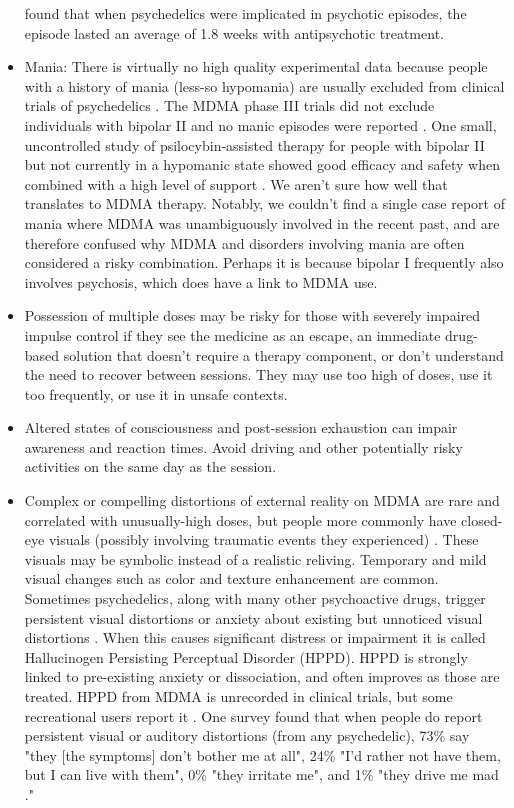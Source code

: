 \documentclass[12pt,letterpaper]{book}
\begin{document}
\begin{itemize}
    \textcite{psychosisTreatment} found that when psychedelics were implicated in psychotic episodes, the episode lasted an average of 1.8 weeks with antipsychotic treatment.
    \item Mania: There is virtually no high quality experimental data because people with a history of mania (less-so hypomania) are usually excluded from clinical trials of psychedelics \cite{gardBipolar}. The MDMA phase III trials did not exclude individuals with bipolar II and no manic episodes were reported \cite{mitchellMDMAClinicalTrial2}. One small, uncontrolled study of psilocybin-assisted therapy for people with bipolar II but not currently in a hypomanic state showed good efficacy and safety when combined with a high level of support \cite{aaronsonBipolarII}. We aren't sure how well that translates to MDMA therapy. Notably, we couldn't find a single case report of mania where MDMA was unambiguously involved in the recent past, and are therefore confused why MDMA and disorders involving mania are often considered a risky combination. Perhaps it is because bipolar I frequently also involves psychosis, which does have a link to MDMA use.
    \item Possession of multiple doses may be risky for those with severely impaired impulse control if they see the medicine as an escape, an immediate drug-based solution that doesn't require a therapy component, or don't understand the need to recover between sessions. They may use too high of doses, use it too frequently, or use it in unsafe contexts.
    \item Altered states of consciousness and post-session exhaustion can impair awareness and reaction times. Avoid driving and other potentially risky activities on the same day as the session.
    \item Complex or compelling distortions of external reality on MDMA are rare and correlated with unusually-high doses, but people more commonly have closed-eye visuals (possibly involving traumatic events they experienced) \cite{liechtiGender}. These visuals may be symbolic instead of a realistic reliving. Temporary and mild visual changes such as color and texture enhancement are common. Sometimes psychedelics, along with many other psychoactive drugs, trigger persistent visual distortions or anxiety about existing but unnoticed visual distortions \cite{alexanderHPPD,halpernHPPD}. When this causes significant distress or impairment it is called Hallucinogen Persisting Perceptual Disorder (HPPD). HPPD is strongly linked to pre-existing anxiety or dissociation, and often improves as those are treated. HPPD from MDMA is unrecorded in clinical trials, but some recreational users report it \cite{vizeliActuteEffects,litjensHPPD}. One survey found that when people do report persistent visual or auditory distortions (from any psychedelic), 73\% say "they [the symptoms] don't bother me at all", 24\% "I'd rather not have them, but I can live with them", 0\% "they irritate me", and 1\% "they drive me mad \cite{carhart2010user}."
\end{itemize}
\end{document}
